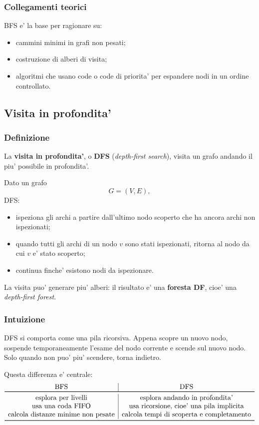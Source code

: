 \subsubsection{Collegamenti teorici}
BFS e' la base per ragionare su:
\begin{itemize}
	\item cammini minimi in grafi non pesati;
	\item costruzione di alberi di visita;
	\item algoritmi che usano code o code di priorita' per espandere nodi in un ordine controllato.
\end{itemize}

\subsection{Visita in profondita'}

\subsubsection{Definizione}
La \textbf{visita in profondita'}, o \textbf{DFS} (\emph{depth-first search}), visita un grafo andando il piu' possibile in profondita'.

Dato un grafo
\[
G=(V,E),
\]
DFS:
\begin{itemize}
	\item ispeziona gli archi a partire dall'ultimo nodo scoperto che ha ancora archi non ispezionati;
	\item quando tutti gli archi di un nodo $v$ sono stati ispezionati, ritorna al nodo da cui $v$ e' stato scoperto;
	\item continua finche' esistono nodi da ispezionare.
\end{itemize}

La visita puo' generare piu' alberi: il risultato e' una \textbf{foresta DF}, cioe' una \emph{depth-first forest}.

\subsubsection{Intuizione}
DFS si comporta come una pila ricorsiva. Appena scopre un nuovo nodo, sospende temporaneamente l'esame del nodo corrente e scende sul nuovo nodo. Solo quando non puo' piu' scendere, torna indietro.

Questa differenza e' centrale:
\[
\begin{array}{c|c}
\text{BFS} & \text{DFS} \\
\toprule
\text{esplora per livelli} & \text{esplora andando in profondita'} \\
\text{usa una coda FIFO} & \text{usa ricorsione, cioe' una pila implicita} \\
\text{calcola distanze minime non pesate} & \text{calcola tempi di scoperta e completamento} \\
\bottomrule
\end{array}
\]

